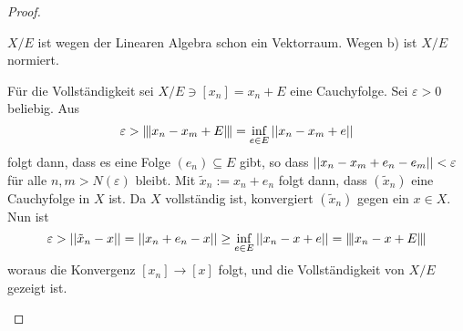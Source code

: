 \documentclass[FunkAnaSkript.tex]{subfiles}
\begin{document}
\begin{proof}
\begin{enumerate}[(a)]
	$X/E$ ist wegen der Linearen Algebra schon ein Vektorraum. Wegen b) ist $X/E$ normiert.\par 
	Für die Vollständigkeit sei $X/E \ni [x_n] = x_n + E$ eine Cauchyfolge. Sei $\varepsilon > 0$ beliebig. Aus
	$$\varepsilon > \interleave{x_n-x_m+E}\interleave = \inf_{e\in E} \left\lvert \left\lvert x_n-x_m+e \right\rvert \right\rvert$$ 
	folgt dann, dass es eine Folge $(e_n) \subseteq E$ gibt, so dass 
	$\left\lvert \left\lvert x_n-x_m+e_n-e_m \right\rvert \right\rvert < \varepsilon$ für alle $n,m > N(\varepsilon)$ bleibt.
	Mit $\tilde{x}_n:=x_n+e_n$ folgt dann, dass $(\tilde{x}_n)$ eine Cauchyfolge in $X$ ist. Da $X$ vollständig ist, konvergiert $(\tilde{x}_n)$ gegen ein $x\in X$.
	Nun ist
	$$\varepsilon > \left\lvert \left\lvert \tilde{x}_n -x \right\rvert \right\rvert = \left\lvert \left\lvert x_n + e_n - x \right\rvert \right\rvert \geq \inf_{e\in E} \left\lvert \left\lvert x_n -x +e \right\rvert \right\rvert = \interleave{x_n - x +E}\interleave$$
	woraus die Konvergenz $[x_n] \to [x]$ folgt, und die Vollständigkeit von $X/E$ gezeigt ist.		
	\end{enumerate}
\end{proof}




\end{document}
